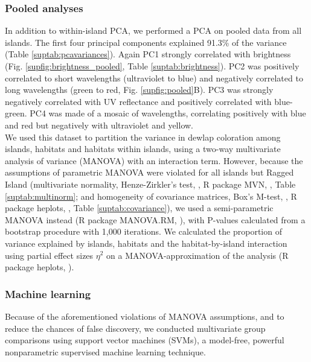 \subsubsection*{Pooled analyses}

In addition to within-island PCA, we performed a PCA on pooled data from all islands. The first four principal components explained 91.3\% of the variance (Table \ref{suptab:pcavariances}). Again PC1 strongly correlated with brightness (Fig. \ref{supfig:brightness_pooled}, Table \ref{suptab:brightness}). PC2 was positively correlated to short wavelengths (ultraviolet to blue) and negatively correlated to long wavelengths (green to red, Fig. \ref{supfig:pooled}B). PC3 was strongly negatively correlated with UV reflectance and positively correlated with blue-green. PC4 was made of a mosaic of wavelengths, correlating positively with blue and red but negatively with ultraviolet and yellow.\\

We used this dataset to partition the variance in dewlap coloration among islands, habitats and habitats within islands, using a two-way multivariate analysis of variance (MANOVA) with an interaction term. However, because the assumptions of parametric MANOVA were violated for all islands but Ragged Island (multivariate normality, Henze-Zirkler's test, \citealt{Henze1990}, R package MVN, \citealt{Korkmaz2014}, Table \ref{suptab:multinorm}; and homogeneity of covariance matrices, Box's M-test, \citealt{Box1949, Morrison1988}, R package heplots, \citealt{Fox2018}, Table \ref{suptab:covariance}), we used a semi-parametric MANOVA instead (R package MANOVA.RM, \citealt{Friedrich2018}), with P-values calculated from a bootstrap procedure with 1,000 iterations. We calculated the proportion of variance explained by islands, habitats and the habitat-by-island interaction using partial effect sizes $\eta^2$ on a MANOVA-approximation of the analysis (R package heplots, \citealt{Fox2018}).

\subsubsection*{Machine learning}


Because of the aforementioned violations of MANOVA assumptions, and to reduce the chances of false discovery, we conducted multivariate group comparisons using support vector machines (SVMs), a model-free, powerful nonparametric supervised machine learning technique.\\

